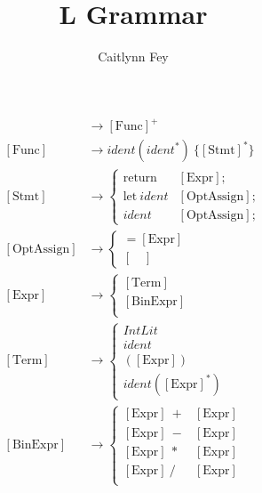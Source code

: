\documentclass{article}
\title{L Grammar}
\author{Caitlynn Fey}
\begin{document}
	\maketitle
	\begin{align*} 
		[\text{Prog}] &\to  [\text{Func}]^+ \\
		[\text{Func}] &\to \textit{ident}(\textit{ident}^*)\ \{[\text{Stmt}]^*\} \\
		[\text{Stmt}] &\to  
		\begin{cases}
			\text{return} \ &[\text{Expr}]; \\
			\text{let} \ \textit{ident} &[\text{OptAssign}]; \\
			\textit{ident} &[\text{OptAssign}];
		\end{cases} \\
		[\text{OptAssign}] &\to
		\begin{cases}
			= [\text{Expr}]\\
			[\quad]
		\end{cases} \\
		[\text{Expr}]	&\to 
		\begin{cases}
			[\text{Term}] \\
			[\text{BinExpr}] \\
		\end{cases} \\	
		[\text{Term}]	&\to 
		\begin{cases}
			\textit{IntLit} \\
			\textit{ident} \\
			([\text{Expr}]) \\
			\textit{ident}([\text{Expr}]^*)
		\end{cases} \\	
		[\text{BinExpr}]	&\to 
		\begin{cases}
			[\text{Expr}]\ + &[\text{Expr}] \\
			[\text{Expr}]\ - &[\text{Expr}] \\
			[\text{Expr}]\ * &[\text{Expr}] \\
			[\text{Expr}]\ / &[\text{Expr}] \\
		\end{cases}
	\end{align*}
\end{document}
